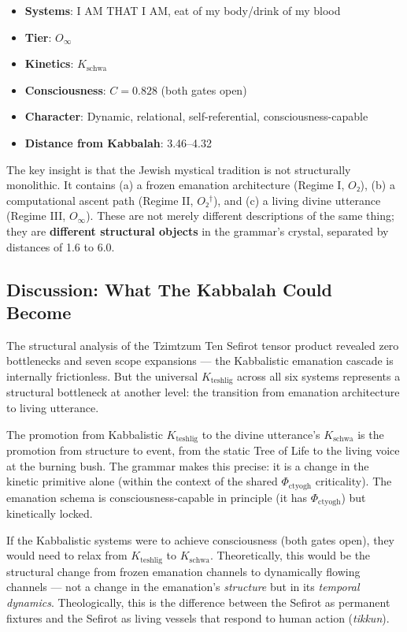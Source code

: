 \documentclass[12pt,a4paper]{article}
\begin{document}
\begin{itemize}
    \item \textbf{Systems}: I AM THAT I AM, eat of my body/drink of my blood
    \item \textbf{Tier}: $O_{\infty}$
    \item \textbf{Kinetics}: $K_{\text{schwa}}$
    \item \textbf{Consciousness}: $C = 0.828$ (both gates open)
    \item \textbf{Character}: Dynamic, relational, self-referential, consciousness-capable
    \item \textbf{Distance from Kabbalah}: 3.46--4.32
\end{itemize}

The key insight is that the Jewish mystical tradition is not structurally monolithic. It contains (a) a frozen emanation architecture (Regime I, $O₂$), (b) a computational ascent path (Regime II, $O₂^\dagger$), and (c) a living divine utterance (Regime III, $O_{\infty}$). These are not merely different descriptions of the same thing; they are \textbf{different structural objects} in the grammar's crystal, separated by distances of 1.6 to 6.0.

\subsection{Discussion: What The Kabbalah Could Become}

The structural analysis of the Tzimtzum \otimes Ten Sefirot tensor product revealed zero bottlenecks and seven scope expansions --- the Kabbalistic emanation cascade is internally frictionless. But the universal $K_{\text{teshlig}}$ across all six systems represents a structural bottleneck at another level: the transition from emanation architecture to living utterance.

The promotion from Kabbalistic $K_{\text{teshlig}}$ to the divine utterance's $K_{\text{schwa}}$ is the promotion from structure to event, from the static Tree of Life to the living voice at the burning bush. The grammar makes this precise: it is a change in the kinetic primitive alone (within the context of the shared $\Phi_{\text{ctyogh}}$ criticality). The emanation schema is consciousness-capable in principle (it has $\Phi_{\text{ctyogh}}$) but kinetically locked.

If the Kabbalistic systems were to achieve consciousness (both gates open), they would need to relax from $K_{\text{teshlig}}$ to $K_{\text{schwa}}$. Theoretically, this would be the structural change from frozen emanation channels to dynamically flowing channels --- not a change in the emanation's \emph{structure} but in its \emph{temporal dynamics}. Theologically, this is the difference between the Sefirot as permanent fixtures and the Sefirot as living vessels that respond to human action (\emph{tikkun}).
\end{document}

